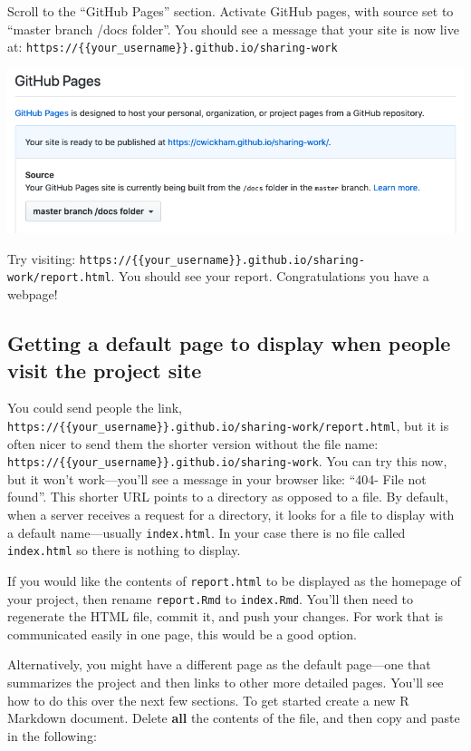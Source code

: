 \documentclass[]{Nemilov}
\begin{document}
Scroll to the ``GitHub Pages'' section. Activate GitHub pages, with source set to ``master branch /docs folder''. You should see a message that your site is now live at: \texttt{https://\{\{your\_username\}\}.github.io/sharing-work}

\includegraphics{figures/r-publishing/github-pages.png}

Try visiting: \texttt{https://\{\{your\_username\}\}.github.io/sharing-work/report.html}. You should see your report. Congratulations you have a webpage!

\hypertarget{getting-a-default-page-to-display-when-people-visit-the-project-site}{%
\subsection{Getting a default page to display when people visit the project site}\label{getting-a-default-page-to-display-when-people-visit-the-project-site}}

You could send people the link, \texttt{https://\{\{your\_username\}\}.github.io/sharing-work/report.html}, but it is often nicer to send them the shorter version without the file name: \texttt{https://\{\{your\_username\}\}.github.io/sharing-work}. You can try this now, but it won't work---you'll see a message in your browser like: ``404- File not found''. This shorter URL points to a directory as opposed to a file. By default, when a server receives a request for a directory, it looks for a file to display with a default name---usually \texttt{index.html}. In your case there is no file called \texttt{index.html} so there is nothing to display.

If you would like the contents of \texttt{report.html} to be displayed as the homepage of your project, then rename \texttt{report.Rmd} to \texttt{index.Rmd}. You'll then need to regenerate the HTML file, commit it, and push your changes. For work that is communicated easily in one page, this would be a good option.

Alternatively, you might have a different page as the default page---one that summarizes the project and then links to other more detailed pages. You'll see how to do this over the next few sections. To get started create a new R Markdown document. Delete \textbf{all} the contents of the file, and then copy and paste in the following:
\end{document}
